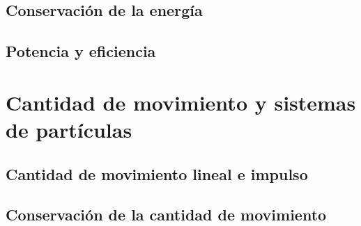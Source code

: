 ﻿\documentclass[11pt,letterpaper,openany]{book}
\newcommand{\rutaraiz}{../..}
\begin{document}




\chapter{Conservación de la energía}





\chapter{Potencia y eficiencia}





\part{Cantidad de movimiento y sistemas de partículas}



\chapter{Cantidad de movimiento lineal e impulso}





\chapter{Conservación de la cantidad de movimiento}
\end{document}
